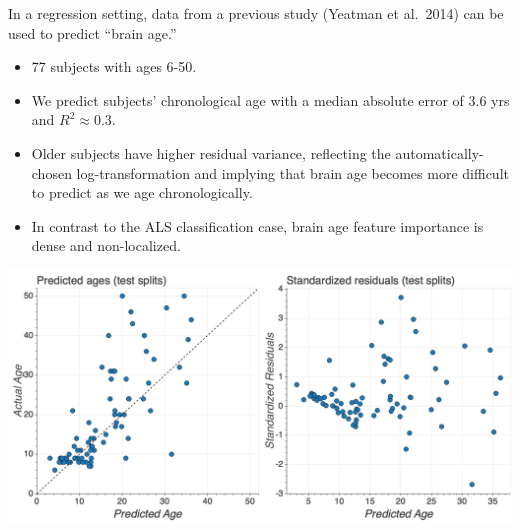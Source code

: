 \documentclass[a0paper,portrait,fontscale=0.395]{baposter}
\newenvironment{Figure}
  {\par\medskip\noindent\minipage{\linewidth}}
  {\endminipage\par\medskip}
\begin{document}
\begin{poster}
{\begin{minipage}[t]{0.45\linewidth}
\vspace{1em}
\noindent In a regression setting, data from a previous study (Yeatman et al.~2014) can be used to predict ``brain age.''
\begin{itemize}
    \item 77 subjects with ages 6-50.
    \item We predict subjects' chronological age with a median absolute error of 3.6 yrs and $R^2 \approx 0.3$.
    \item Older subjects have higher residual variance, reflecting the automatically-chosen log-transformation and implying that brain age becomes more difficult to predict as we age chronologically.
    \item In contrast to the ALS classification case, brain age feature importance is dense and non-localized.
\end{itemize}
\end{minipage}
\hspace{0.03\linewidth}
\begin{minipage}[t]{0.5\linewidth}
\begin{Figure}
    \centering
    \includegraphics[width=\linewidth]{regression_residuals.png}
\end{Figure}
\end{minipage}

}
\end{poster}
\end{document}
